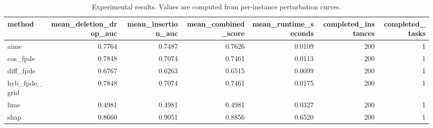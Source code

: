 \begin{table}[t]
\caption{Experimental results. Values are computed from per-instance perturbation curves.}
\label{tab:main_results_computed}
\centering
\begin{tabular}{lrrrrrr}
\toprule
method & mean\_deletion\_drop\_auc & mean\_insertion\_auc & mean\_combined\_score & mean\_runtime\_seconds & completed\_instances & completed\_tasks \\
\midrule
aime & 0.7764 & 0.7487 & 0.7626 & 0.0109 & 200 & 1 \\
cos\_fpde & 0.7848 & 0.7074 & 0.7461 & 0.0113 & 200 & 1 \\
diff\_fpde & 0.6767 & 0.6263 & 0.6515 & 0.0099 & 200 & 1 \\
hyb\_fpde\_grid & 0.7848 & 0.7074 & 0.7461 & 0.0175 & 200 & 1 \\
lime & 0.4981 & 0.4981 & 0.4981 & 0.0327 & 200 & 1 \\
shap & 0.8660 & 0.9051 & 0.8856 & 0.6520 & 200 & 1 \\
\bottomrule
\end{tabular}

\end{table}
